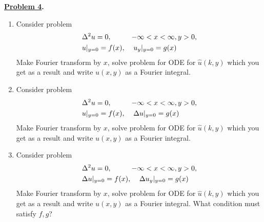 \documentclass{article}
\theoremstyle{definition}
\newenvironment{boldenv}{\bfseries\boldmath}{}
\begin{document}
\begin{boldenv}
    \underline{Problem 4}.
    \begin{enumerate}
        \item Consider problem \begin{align}
            & \Delta^2u = 0, \mkern 50mu -\infty < x < \infty, y > 0,\\
            & u|_{y=0} = f(x), \mkern 20mu u_y|_{y=0} = g(x)
        \end{align}
        Make Fourier transform by $x$, solve problem for ODE for $\hat{u}(k, y)$ which you get as a result and write $u(x,y)$ as a Fourier integral.
        \item Consider problem \begin{align}
            & \Delta^2u = 0, \mkern 50mu -\infty < x < \infty, y > 0,\\
            & u|_{y=0} = f(x), \mkern 20mu \Delta u|_{y=0} = g(x)
        \end{align}
        Make Fourier transform by $x$, solve problem for ODE for $\hat{u}(k, y)$ which you get as a result and write $u(x,y)$ as a Fourier integral.
        \item Consider problem \begin{align}
            & \Delta^2u = 0, \mkern 50mu -\infty < x < \infty, y > 0,\\
            & \Delta u|_{y=0} = f(x), \mkern 20mu \Delta u_y|_{y=0} = g(x)
        \end{align}
        Make Fourier transform by $x$, solve problem for ODE for $\hat{u}(k, y)$ which you get as a result and write $u(x,y)$ as a Fourier integral. What condition must satisfy $f, g$?
    \end{enumerate}
\end{boldenv}
\end{document}
